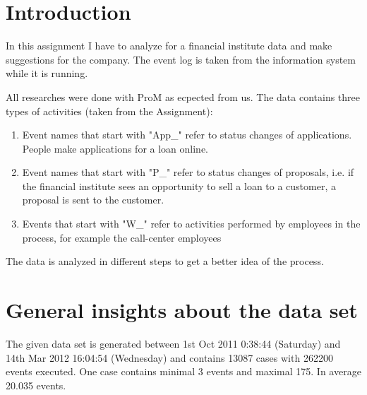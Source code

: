 \section{Introduction}
In this assignment I have to analyze for a financial institute data and make suggestions for the company. The event log is taken from the information system while it is running. 

All researches were done with ProM as ecpected from us. The data contains three types of activities (taken from the Assignment):

\begin{enumerate}
	\item Event names that start with "App\_" refer to status changes of applications. People make applications for a loan online.
	\item Event names that start with "P\_" refer to status changes of proposals, i.e. if the financial institute sees an opportunity to sell a loan to a customer, a proposal is sent to the customer.
	\item Events that start with "W\_" refer to activities performed by employees in the process, for example the call-center employees
\end{enumerate}

The data is analyzed in different steps to get a better idea of the process.

\section{General insights about the data set}

The given data set is generated between 1st Oct 2011 0:38:44 (Saturday) and 14th Mar 2012 16:04:54 (Wednesday) and contains 13087 cases with 262200 events executed. One case contains minimal 3 events and maximal 175. In average 20.035 events.

